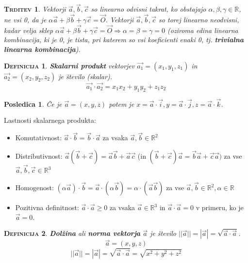 \documentclass[a4paper,12pt]{article}
\newtheorem*{trditev}{\textsc{Trditev}}
\newtheorem*{posl}{Posledica}
\newtheorem*{definicija}{\textsc{Definicija}}
\begin{document}
\begin{trditev}
    Vektorji $\vec{a}, \vec{b}, \vec{c}$ so linearno odvisni takrat, ko obstajajo $\alpha, \beta, \gamma \in \mathbb{R}$, ne vsi 0, da je $\alpha \vec{a} + \beta \vec{b} + \gamma \vec{c} = \vec{O}$. Vektorji $\vec{a}, \vec{b}, \vec{c}$ so torej linearno neodvisni, kadar velja sklep $\alpha \vec{a} + \beta \vec{b} + \gamma \vec{c} = \vec{O} \Rightarrow \alpha = \beta = \gamma = 0$ (oziroma edina linearna kombinacija, ki je 0, je tista, pri katerem so vsi koeficienti enaki 0, tj. \textbf{trivialna linearna kombinacija}).\\
\end{trditev}

\begin{definicija}
\textbf{Skalarni produkt} vektorjev $\vec{a_1}=(x_1, y_1, z_1)$ in $\vec{a_2} = (x_2, y_2, z_2)$ je število (skalar). $$ \vec{a_1} \cdot \vec{a_2} = x_1 x_2 + y_1 y_2 + z_1 z_2$$ 
\end{definicija}

\begin{posl}
Če je $\vec{a} = (x,y,z)$ potem je $x= \vec{a} \cdot \vec{i}, y = \vec{a} \cdot \vec{j}, z = \vec{a} \cdot \vec{k}$.\\
\end{posl}

Lastnosti skalarnega produkta:
\begin{itemize}
\item Komutativnost: $\vec{a} \cdot \vec{b} = \vec{b} \cdot \vec{a}$ za vsaka $\vec{a}, \vec{b} \in \mathbb{R}^2$
\item Distributivnost: $\vec{a}(\vec{b} + \vec{c}) = \vec{a} \vec{b} + \vec{a} \vec{c}$  (in $(\vec{b} + \vec{c}) \vec{a} = \vec{b} \vec{a} + \vec{c} \vec{a})$ za vse $\vec{a}, \vec{b}, \vec{c} \in \mathbb{R}^3$
\item Homogenost: $(\alpha \vec{a}) \cdot \vec{b} = \vec{a} \cdot (\alpha \vec{b}) = \alpha \cdot (\vec{a} \vec{b})$ za vse $\vec{a}, \vec{b} \in \mathbb{R}^2, \alpha \in \mathbb{R}$
\item Pozitivna definitnost: $\vec{a} \cdot \vec{a} \geq 0$ za vsaka $\vec{a} \in \mathbb{R}^3$ in $\vec{a} \cdot \vec{a} = 0$ v primeru, ko je $\vec{a} = 0$.\\
\end{itemize}

\begin{definicija}
\textbf{Dolžina} ali \textbf{norma vektorja} $\vec{a}$ je število $||\vec{a}|| = |\vec{a}| = \sqrt{\vec{a} \cdot \vec{a}}$. $$ \vec{a} = (x,y,z)$$ $$|| \vec{a}|| = |\vec{a}| = \sqrt{\vec{a} \cdot \vec{a}} = \sqrt{x^2 + y^2 + z^2}$$
\end{definicija}
\end{document}

